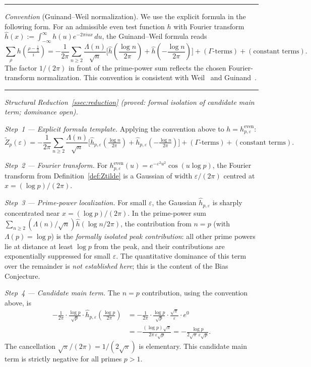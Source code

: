 \documentclass[11pt]{article}
\newenvironment{conventionbox}{%
  \medskip
  \noindent\rule{\linewidth}{0.4pt}\smallskip\par\noindent
}{%
  \par\smallskip\noindent\rule{\linewidth}{0.4pt}
  \medskip
}
\newcommand{\Zt}{\widetilde{Z}}
\begin{document}
\begin{conventionbox}
\emph{Convention} (Guinand--Weil normalization).
We use the explicit formula in the following form.
For an admissible even test function $h$ with Fourier transform
$\hat{h}(x) := \int_{-\infty}^\infty h(u)e^{-2\pi i ux}\,du$,
the Guinand--Weil formula reads
\[
\sum_\rho h\!\left(\tfrac{\rho-\frac12}{i}\right)
  = -\frac{1}{2\pi}\sum_{n\geq 2}\frac{\Lambda(n)}{\sqrt{n}}
    \bigl[\hat{h}({\textstyle\frac{\log n}{2\pi}})
          + \hat{h}({-\textstyle\frac{\log n}{2\pi}})\bigr]
  + (\Gamma\text{-terms}) + (\text{constant terms}).
\]
The factor $1/(2\pi)$ in front of the prime-power sum reflects
the chosen Fourier-transform normalization.
This convention is consistent with Weil~\cite{Weil} and
Guinand~\cite{Guinand}.
\end{conventionbox}

\textit{Structural Reduction~\ref{ssec:reduction}
(proved: formal isolation of candidate main term; dominance open).}

\medskip

\textit{Step~1 --- Explicit formula template.}
Applying the convention above to $h=h^{\mathrm{even}}_{p,\varepsilon}$:
\[
\Zt_p(\varepsilon)
  = -\frac{1}{2\pi}\sum_{n\geq 2}\frac{\Lambda(n)}{\sqrt{n}}
    \bigl[\hat{h}_{p,\varepsilon}({\textstyle\tfrac{\log n}{2\pi}})
    + \hat{h}_{p,\varepsilon}({-\textstyle\tfrac{\log n}{2\pi}})\bigr]
  + (\Gamma\text{-terms}) + (\text{constant terms}).
\]

\textit{Step~2 --- Fourier transform.}
For $h^{\mathrm{even}}_{p,\varepsilon}(u)=e^{-\varepsilon^2 u^2}\cos(u\log p)$,
the Fourier transform from Definition~\ref{def:Ztilde} is
a Gaussian of width $\varepsilon/(2\pi)$ centred at $x=(\log p)/(2\pi)$.

\textit{Step~3 --- Prime-power localization.}
For small $\varepsilon$, the Gaussian $\hat{h}_{p,\varepsilon}$ is
sharply concentrated near $x=(\log p)/(2\pi)$.
In the prime-power sum $\sum_{n\geq 2}(\Lambda(n)/\sqrt{n})\hat{h}(\log n/2\pi)$,
the contribution from $n=p$ (with $\Lambda(p)=\log p$) is the
\textit{formally isolated peak contribution}: all other prime powers lie
at distance at least $\log p$ from the peak, and their contributions
are exponentially suppressed for small $\varepsilon$.
The quantitative dominance of this term over the remainder is
\textit{not established here}; this is the content of the
Bias Conjecture.

\textit{Step~4 --- Candidate main term.}
The $n=p$ contribution, using the convention above, is
\begin{align*}
-\frac{1}{2\pi}\cdot\frac{\log p}{\sqrt{p}}\cdot\hat{h}_{p,\varepsilon}
  \!\left(\tfrac{\log p}{2\pi}\right)
&= -\frac{1}{2\pi}\cdot\frac{\log p}{\sqrt{p}}\cdot\frac{\sqrt{\pi}}{\varepsilon}
   \cdot e^0 \\
&= -\frac{(\log p)\sqrt{\pi}}{2\pi\,\varepsilon\sqrt{p}}
 = -\frac{\log p}{2\sqrt{\pi}\,\varepsilon\sqrt{p}}.
\end{align*}
The cancellation $\sqrt{\pi}/(2\pi)=1/(2\sqrt{\pi})$ is elementary.
This candidate main term is strictly negative for all primes $p>1$.
\end{document}
